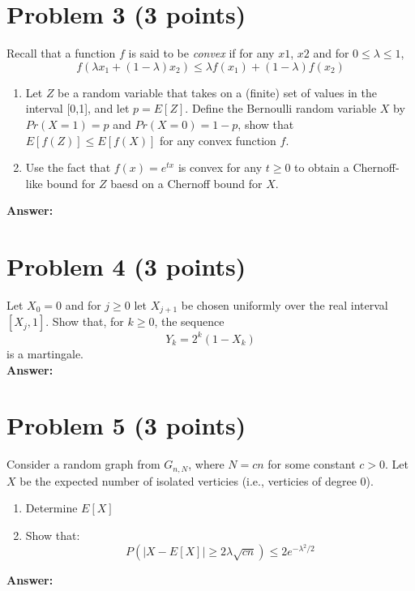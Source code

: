 \documentclass[letterpaper, 11pt]{article}
\begin{document}
\pagebreak
\section*{Problem 3 (3 points)}
Recall that a function $f$ is said to be \emph{convex} if for any $x1$, $x2$ and for $0 \leq \lambda \leq 1$,
$$f(\lambda x_1 + (1-\lambda)x_2) \leq \lambda f(x_1) + (1-\lambda)f(x_2)$$
\begin{enumerate}
	\item Let $Z$ be a random variable that takes on a (finite) set of values in the interval [0,1], and let $p=E[Z]$. Define the Bernoulli random variable $X$ by $Pr(X=1)=p$ and $Pr(X=0)=1-p$, show that $E[f(Z)] \leq E[f(X)]$ for any convex function $f$.
	\item Use the fact that $f(x) = e^{tx}$ is convex for any $t \geq 0$ to obtain a Chernoff-like bound for $Z$ baesd on a Chernoff bound for $X$.
\end{enumerate}
\textbf{Answer:} \\


\pagebreak
\section*{Problem 4 (3 points)}
Let $X_0=0$ and for $j \geq 0$ let $X_{j+1}$ be chosen uniformly over the real interval $[X_j,1]$. Show that, for $k \geq 0$, the sequence
$$Y_k=2^k(1-X_k)$$
is a martingale. \\
\textbf{Answer:} \\


\pagebreak
\section*{Problem 5 (3 points)}
Consider a random graph from $G_{n,N}$, where $N=cn$ for some constant $c>0$. Let $X$ be the expected number of isolated verticies (i.e., verticies of degree 0).
\begin{enumerate}
	\item Determine $E[X]$
	\item Show that:
		$$ P(|X-E[X]| \geq 2\lambda \sqrt{cn}) \leq 2e^{- \lambda^2/2}$$
\end{enumerate}
\textbf{Answer:} \\
\end{document}
